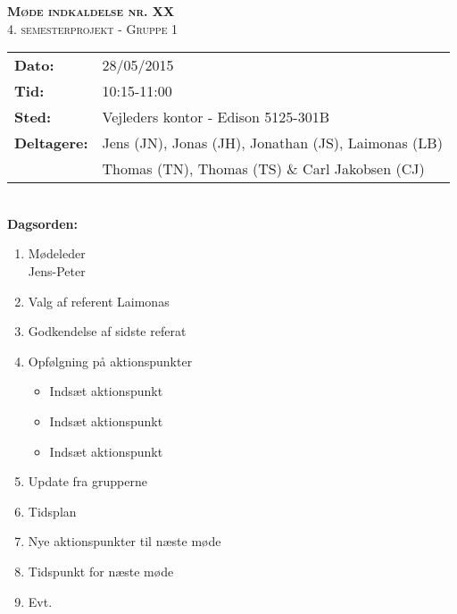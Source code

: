 
\newcommand{\HRule}{\rule{\linewidth}{0.1mm}}


	\begin{center}
		{\huge \bfseries \textsc{Møde indkaldelse nr. XX}}\\
		\textsc{\large 4. semesterprojekt - Gruppe 1}\\[0.3cm]
	\end{center}
	\begin{tabular}{ll}
	\large \textbf{Dato:} & 28/05/2015  \\ %
	\large \textbf{Tid:}  & 10:15-11:00 \\ %
	\large \textbf{Sted:} & Vejleders kontor - Edison 5125-301B		\\ %
	\large \textbf{Deltagere:} & Jens (JN), Jonas (JH), Jonathan (JS), Laimonas (LB) \\
	\large \textbf & Thomas (TN),  Thomas (TS) \& Carl Jakobsen (CJ)\\
	\end{tabular}\\
	\phantom{\,}\hspace{0.1em} \large \textbf{Dagsorden:}
	\begin{enumerate}
		\itemsep 0.3em 
		\item Mødeleder\\
			Jens-Peter
		\item Valg af referent
			Laimonas
		\item Godkendelse af sidste referat
		\item Opfølgning på aktionspunkter
		\begin{itemize}
			\itemsep 0.3em 
			\item Indsæt aktionspunkt
			\item Indsæt aktionspunkt
			\item Indsæt aktionspunkt
		\end{itemize}
		\item Update fra grupperne
		\item Tidsplan
		\item Nye aktionspunkter til næste møde
		\item Tidspunkt for næste møde
		\item Evt.
	\end{enumerate}
